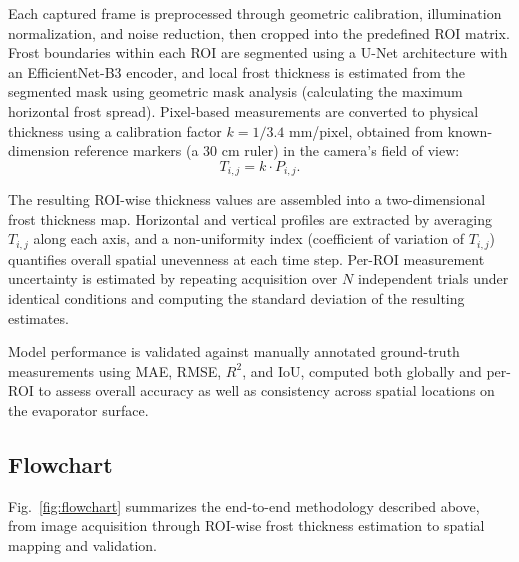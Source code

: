 \documentclass[a4paper,fleqn]{cas-dc}
\begin{document}
Each captured frame is preprocessed through geometric calibration, illumination normalization, and noise reduction, then cropped into the predefined ROI matrix. Frost boundaries within each ROI are segmented using a U-Net architecture with an EfficientNet-B3 encoder, and local frost thickness is estimated from the segmented mask using geometric mask analysis (calculating the maximum horizontal frost spread). Pixel-based measurements are converted to physical thickness using a calibration factor $k = 1/3.4$ mm/pixel, obtained from known-dimension reference markers (a 30 cm ruler) in the camera's field of view:
\begin{equation}\label{eq:calib}
T_{i,j} = k \cdot P_{i,j}.
\end{equation}

The resulting ROI-wise thickness values are assembled into a two-dimensional frost thickness map. Horizontal and vertical profiles are extracted by averaging $T_{i,j}$ along each axis, and a non-uniformity index (coefficient of variation of $T_{i,j}$) quantifies overall spatial unevenness at each time step. Per-ROI measurement uncertainty is estimated by repeating acquisition over $N$ independent trials under identical conditions and computing the standard deviation of the resulting estimates.

Model performance is validated against manually annotated ground-truth measurements using MAE, RMSE, $R^2$, and IoU, computed both globally and per-ROI to assess overall accuracy as well as consistency across spatial locations on the evaporator surface.

\subsection{Flowchart}\label{sec:flowchart}
Fig.~\ref{fig:flowchart} summarizes the end-to-end methodology described above, from image acquisition through ROI-wise frost thickness estimation to spatial mapping and validation.
\end{document}
